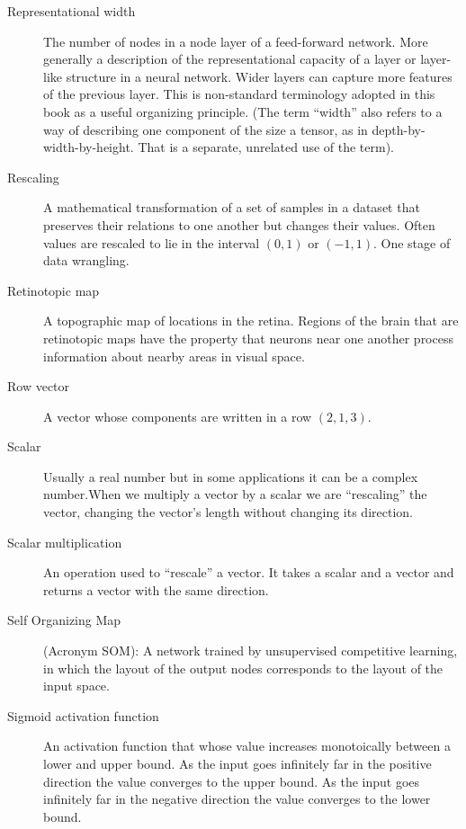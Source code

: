 \begin{description}
\item[Representational width] The number of nodes in a node layer of a feed-forward network. More generally a description of the representational capacity of a layer or layer-like structure in a neural network. Wider layers can capture more features of the previous layer. This is non-standard terminology adopted in this book as a useful organizing principle. (The term ``width'' also refers to a way of describing one component of the size a tensor, as in depth-by-width-by-height. That is a separate, unrelated use of the term).

\item[Rescaling] A mathematical transformation of a set of samples in a dataset that preserves their relations to one another but changes their values. Often values are rescaled to lie in the interval $(0,1)$ or $(-1,1)$. One stage of data wrangling.


\item[Retinotopic map] A topographic map of locations in the retina. Regions of the brain that are retinotopic maps have the property that neurons near one another process information about nearby areas in visual space.

\item[Row vector] A vector whose components are written in a row \eg $(2,1,3)$.

\item[Scalar] Usually a real number but in some applications it can be a complex number.When we multiply a vector by a scalar we are ``rescaling'' the vector, \ie changing the vector's length without changing its direction.

\item[Scalar multiplication] An operation used to ``rescale'' a vector. It takes a scalar and a vector and returns a vector with the same direction.

\item[Self Organizing Map] (Acronym SOM):  A network trained by unsupervised competitive learning, in which the layout of the output nodes corresponds to the layout of the input space.

\item[Sigmoid activation function] An activation function that whose value increases monotoically between a lower and upper bound. As the input goes infinitely far in the positive direction the value converges to the upper bound. As the input goes infinitely far in the negative direction the value converges to the lower bound.


\end{description}
